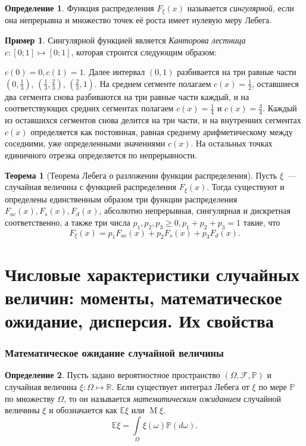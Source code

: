 \documentclass[oneside,final,14pt]{extreport}
\theoremstyle{plain}
\theoremstyle{definition}
\newtheorem*{defn}{Определение}
\newtheorem*{exmp}{Пример}
\theoremstyle{named}
\newtheorem*{namedthm}{Теорема}
\begin{document}
\begin{defn}
    Функция распределения $F_\xi(x)$ называется {\it сингулярной}, если она непрерывна и множество точек её роста имеет нулевую меру Лебега.
\end{defn}
\begin{exmp}
    Сингулярной функцией является \textit{Канторова лестница} $c \colon [0;1] \mapsto [0;1]$, которая строится следующим образом:
    
    $c(0) = 0, c(1) = 1$. Далее интервал $(0, 1)$ разбивается на три равные части $(0, \frac{1}{3})$, $(\frac{1}{3}, \frac{2}{3})$, $(\frac{2}{3}, 1)$. На среднем сегменте полагаем $c(x) = \frac{1}{2}$, оставшиеся два сегмента снова разбиваются на три равные части каждый, и на соответствующих средних сегментах полагаем $c(x) = \frac{1}{4}$ и $c(x) = \frac{3}{4}$. Каждый из оставшихся сегментов снова делится на три части, и на внутренних сегментах $c(x)$ определяется как постоянная, равная среднему арифметическому между соседними, уже определенными значениями $c(x)$. На остальных точках единичного отрезка определяется по непрерывности. 
\end{exmp}

\begin{namedthm}[Теорема Лебега о разложении функции распределения]
    Пусть $\xi$~--- случайная величина с функцией распределения $F_\xi(x).$ Тогда существуют и определены единственным образом три функции распределения $F_{ac}(x), F_s(x), F_d(x)$, абсолютно непрерывная, сингулярная и дискретная соответственно, а также три числа $p_1, p_2, p_3 \geqslant 0, p_1 + p_2 + p_3 = 1$ такие, что 
    \begin{equation*}
        F_{\xi}(x)=p_{1} F_{ac}(x)+p_{2} F_{s}(x)+p_{3} F_{d}(x).
    \end{equation*}
\end{namedthm}

\section{Числовые характеристики случайных величин: моменты, математическое ожидание, дисперсия. Их свойства}

\subsubsection{Математическое ожидание случайной величины}

\begin{defn}
    Пусть задано вероятностное пространство $(\Omega, \mathcal{F}, \mathbb{P})$ и случайная величина $\xi: \Omega \mapsto \mathbb{R}$. Если существует интеграл Лебега от $\xi$ по мере $\mathbb{P}$ по множеству $\Omega$, то он называется {\it математическим ожиданием} случайной величины $\xi$ и обозначается как $\mathbb{E}\xi$ или $\operatorname{M}\xi$.
    $$ \mathbb{E}\xi = \int\limits_{\Omega} \xi(\omega) \mathbb{P}(d\omega).$$
\end{defn}
\end{document}
